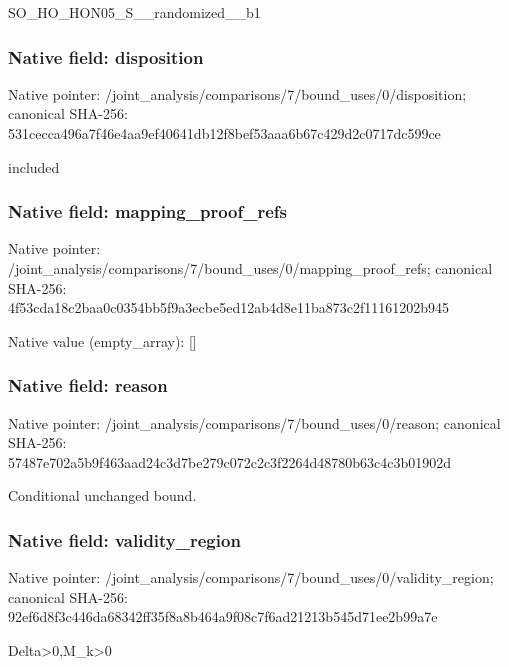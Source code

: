 \documentclass[10pt,a4paper]{article}
\begin{document}
\begingroup\raggedright\sloppy SO\_\allowbreak{}HO\_\allowbreak{}HON05\_\allowbreak{}S\_\allowbreak{}\_\allowbreak{}randomized\_\allowbreak{}\_\allowbreak{}b1\par\endgroup

\subsubsection{Native field: disposition}
Native pointer: /joint\_\allowbreak{}analysis/comparisons/7/bound\_\allowbreak{}uses/0/disposition; canonical SHA-256: 531cecca496a7f46e4aa9ef40641db12f8bef53aaa6b67c429d2c0717dc599ce

\begingroup\raggedright\sloppy included\par\endgroup

\subsubsection{Native field: mapping\_\allowbreak{}proof\_\allowbreak{}refs}
Native pointer: /joint\_\allowbreak{}analysis/comparisons/7/bound\_\allowbreak{}uses/0/mapping\_\allowbreak{}proof\_\allowbreak{}refs; canonical SHA-256: 4f53cda18c2baa0c0354bb5f9a3ecbe5ed12ab4d8e11ba873c2f11161202b945

Native value (empty\_\allowbreak{}array): []

\subsubsection{Native field: reason}
Native pointer: /joint\_\allowbreak{}analysis/comparisons/7/bound\_\allowbreak{}uses/0/reason; canonical SHA-256: 57487e702a5b9f463aad24c3d7be279c072c2c3f2264d48780b63c4c3b01902d

\begingroup\raggedright\sloppy Conditional unchanged bound.\par\endgroup

\subsubsection{Native field: validity\_\allowbreak{}region}
Native pointer: /joint\_\allowbreak{}analysis/comparisons/7/bound\_\allowbreak{}uses/0/validity\_\allowbreak{}region; canonical SHA-256: 92ef6d8f3c446da68342ff35f8a8b464a9f08c7f6ad21213b545d71ee2b99a7e

\begingroup\raggedright\sloppy Delta>0,\allowbreak{}M\_\allowbreak{}k>0\par\endgroup
\end{document}
